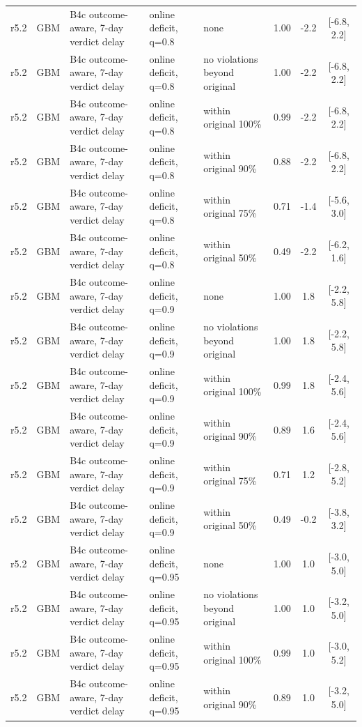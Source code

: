 \begin{longtable}{lllp{4.2cm}p{3.4cm}ccc}
r5.2 & GBM & B4c outcome-aware, 7-day verdict delay & online deficit, q=0.8 & none & 1.00 & -2.2 & [-6.8, 2.2] \\
r5.2 & GBM & B4c outcome-aware, 7-day verdict delay & online deficit, q=0.8 & no violations beyond original & 1.00 & -2.2 & [-6.8, 2.2] \\
r5.2 & GBM & B4c outcome-aware, 7-day verdict delay & online deficit, q=0.8 & within original 100\% & 0.99 & -2.2 & [-6.8, 2.2] \\
r5.2 & GBM & B4c outcome-aware, 7-day verdict delay & online deficit, q=0.8 & within original 90\% & 0.88 & -2.2 & [-6.8, 2.2] \\
r5.2 & GBM & B4c outcome-aware, 7-day verdict delay & online deficit, q=0.8 & within original 75\% & 0.71 & -1.4 & [-5.6, 3.0] \\
r5.2 & GBM & B4c outcome-aware, 7-day verdict delay & online deficit, q=0.8 & within original 50\% & 0.49 & -2.2 & [-6.2, 1.6] \\
r5.2 & GBM & B4c outcome-aware, 7-day verdict delay & online deficit, q=0.9 & none & 1.00 & 1.8 & [-2.2, 5.8] \\
r5.2 & GBM & B4c outcome-aware, 7-day verdict delay & online deficit, q=0.9 & no violations beyond original & 1.00 & 1.8 & [-2.2, 5.8] \\
r5.2 & GBM & B4c outcome-aware, 7-day verdict delay & online deficit, q=0.9 & within original 100\% & 0.99 & 1.8 & [-2.4, 5.6] \\
r5.2 & GBM & B4c outcome-aware, 7-day verdict delay & online deficit, q=0.9 & within original 90\% & 0.89 & 1.6 & [-2.4, 5.6] \\
r5.2 & GBM & B4c outcome-aware, 7-day verdict delay & online deficit, q=0.9 & within original 75\% & 0.71 & 1.2 & [-2.8, 5.2] \\
r5.2 & GBM & B4c outcome-aware, 7-day verdict delay & online deficit, q=0.9 & within original 50\% & 0.49 & -0.2 & [-3.8, 3.2] \\
r5.2 & GBM & B4c outcome-aware, 7-day verdict delay & online deficit, q=0.95 & none & 1.00 & 1.0 & [-3.0, 5.0] \\
r5.2 & GBM & B4c outcome-aware, 7-day verdict delay & online deficit, q=0.95 & no violations beyond original & 1.00 & 1.0 & [-3.2, 5.0] \\
r5.2 & GBM & B4c outcome-aware, 7-day verdict delay & online deficit, q=0.95 & within original 100\% & 0.99 & 1.0 & [-3.0, 5.2] \\
r5.2 & GBM & B4c outcome-aware, 7-day verdict delay & online deficit, q=0.95 & within original 90\% & 0.89 & 1.0 & [-3.2, 5.0] \\

\end{longtable}
